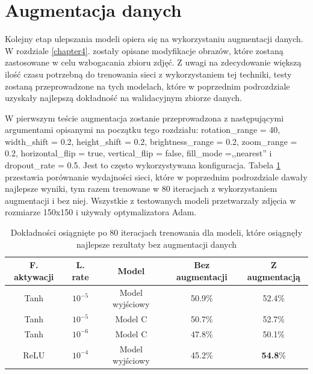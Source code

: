\section{Augmentacja danych}
Kolejny etap ulepszania modeli opiera się na wykorzystaniu augmentacji danych. W rozdziale \ref{chapter4}. zostały opisane modyfikacje obrazów, które zostaną zastosowane w celu wzbogacania zbioru zdjęć. Z uwagi na zdecydowanie większą ilość czasu potrzebną do trenowania sieci z wykorzystaniem tej techniki, testy zostaną przeprowadzone na tych modelach, które w poprzednim podrozdziale uzyskały najlepszą dokładność na walidacyjnym zbiorze danych.

W pierwszym teście augmentacja zostanie przeprowadzona z następującymi argumentami opisanymi na początku tego rozdziału: rotation\_range = 40, width\_shift = 0.2, height\_shift = 0.2, brightness\_range = 0.2, zoom\_range = 0.2, horizontal\_flip = true, vertical\_flip = false, fill\_mode =,,nearest'' i dropout\_rate = 0.5. Jest to często wykorzystywana konfiguracja. Tabela \ref{tab:5.7} przestawia porównanie wydajności sieci, które w poprzednim podrozdziale dawały najlepsze wyniki, tym razem trenowane w 80 iteracjach z wykorzystaniem augmentacji i bez niej. Wszystkie z testowanych modeli przetwarzały zdjęcia w rozmiarze 150x150 i używały optymalizatora Adam.
\begin{table}[H]
  \centering
  \caption{Dokładności osiągnięte po 80 iteracjach trenowania dla modeli, które osiągnęły najlepsze rezultaty bez augmentacji danych}
    \begin{tabular}{ |c|c|c|c|c| }
    \hline
    F. aktywacji & L. rate & Model & Bez augmentacji & Z augmentacją \\
    \hline
    Tanh & $10^{-5}$ & Model wyjściowy & 50.9\% & 52.4\% \\
    Tanh & $10^{-5}$ & Model C & 50.7\% & 52.7\% \\
    Tanh & $10^{-6}$ & Model C & 47.8\% & 50.1\% \\
    ReLU & $10^{-4}$ & Model wyjściowy & 45.2\% & \textbf{54.8}\% \\
    \hline
    \end{tabular}
  \label{tab:5.7}
\end{table}

